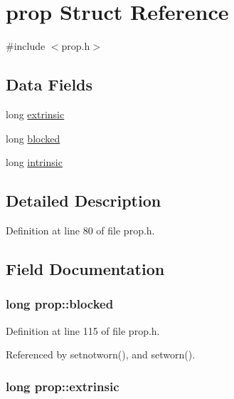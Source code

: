 \hypertarget{structprop}{\section{prop Struct Reference}
\label{structprop}
}


{\ttfamily \#include $<$prop.\+h$>$}

\subsection*{Data Fields}
\begin{DoxyCompactItemize}
\item 
long \hyperlink{structprop_abb64d43d46c8fe8dda8be7af5343794f}{extrinsic}
\item 
long \hyperlink{structprop_abf63a816d40b9af51fbb3304372f4fa7}{blocked}
\item 
long \hyperlink{structprop_ae26d2e1345bcf7f2dae71b84869ff26c}{intrinsic}
\end{DoxyCompactItemize}


\subsection{Detailed Description}


Definition at line 80 of file prop.\+h.



\subsection{Field Documentation}
\hypertarget{structprop_abf63a816d40b9af51fbb3304372f4fa7}{
\subsubsection[{blocked}]{\setlength{\rightskip}{0pt plus 5cm}long prop\+::blocked}}\label{structprop_abf63a816d40b9af51fbb3304372f4fa7}


Definition at line 115 of file prop.\+h.



Referenced by setnotworn(), and setworn().

\hypertarget{structprop_abb64d43d46c8fe8dda8be7af5343794f}{
\subsubsection[{extrinsic}]{\setlength{\rightskip}{0pt plus 5cm}long prop\+::extrinsic}}\label{structprop_abb64d43d46c8fe8dda8be7af5343794f}


